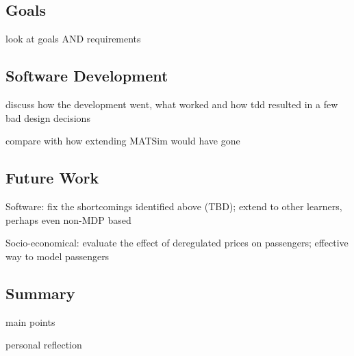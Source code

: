 \subsection{Goals}

look at goals AND requirements


\subsection{Software Development}

discuss how the development went, what worked and how tdd resulted in a few bad
design decisions

compare with how extending MATSim would have gone


\subsection{Future Work}

Software: fix the shortcomings identified above (TBD); extend to other
learners, perhaps even non-MDP based

Socio-economical: evaluate the effect of deregulated prices on
passengers; effective way to model passengers


\subsection{Summary}

main points

personal reflection
